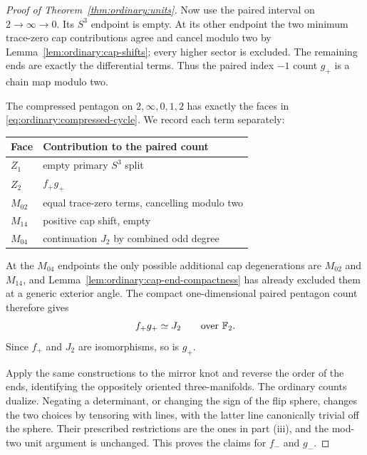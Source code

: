 \begin{proof}[Proof of Theorem~\ref{thm:ordinary:units}]
Now use the paired interval on $2\to\infty\to0$.
Its $S^3$ endpoint is empty.  At its other endpoint
the two minimum trace-zero cap contributions agree
and cancel modulo two by
Lemma~\ref{lem:ordinary:cap-shifts}; every higher
sector is excluded.  The remaining ends are exactly
the differential terms.  Thus the paired index
$-1$ count $g_+$ is a chain map modulo two.

The compressed pentagon on $2,\infty,0,1,2$ has
exactly the faces in
\eqref{eq:ordinary:compressed-cycle}.  We record
each term separately:
\begin{center}
\begin{tabular}{@{}ll@{}}
\toprule
Face & Contribution to the paired count\\
\midrule
$Z_1$ & empty primary $S^3$ split\\
$Z_2$ & $f_+g_+$\\
$M_{02}$ & equal trace-zero terms, cancelling modulo two\\
$M_{14}$ & positive cap shift, empty\\
$M_{04}$ & continuation $J_2$ by combined odd degree\\
\bottomrule
\end{tabular}
\end{center}
At the $M_{04}$ endpoints the only possible additional
cap degenerations are $M_{02}$ and $M_{14}$, and
Lemma~\ref{lem:ordinary:cap-end-compactness} has
already excluded them at a generic exterior angle.
The compact one-dimensional paired pentagon count
therefore gives
\begin{equation}\label{eq:ordinary:two-step-identity}
 f_+g_+\simeq J_2\qquad\text{over }\mathbb F_2.
\end{equation}
Since $f_+$ and $J_2$ are isomorphisms, so is $g_+$.

Apply the same constructions to the mirror knot
and reverse the order of the ends, identifying the
oppositely oriented three-manifolds.  The ordinary
counts dualize.  Negating a determinant, or changing
the sign of the flip sphere, changes the two choices
by tensoring with lines, with the latter line
canonically trivial off the sphere.  Their prescribed
restrictions are the ones in part (iii), and the
mod-two unit argument is unchanged.  This proves
the claims for $f_-$ and $g_-$.
\end{proof}

